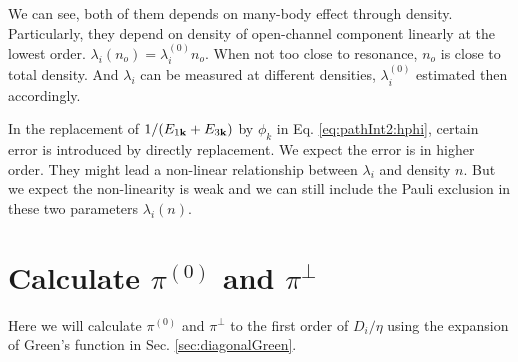We can see, both of them depends on many-body effect through density.  Particularly, they depend on density of open-channel component linearly at the lowest order.  $\lambda_{i}(n_o)=\lambda_{i}^{(0)}n_o$.  When not too close to resonance, $n_o$ is close to total density.  And $\lambda_{i}$ can be measured at different densities,  $\lambda_{i}^{(0)}$ estimated then accordingly. 

In the replacement of $1/(E_{1\mathbf{k}}+E_{3\mathbf{k}})$ by $\phi_{k}$ in Eq. \ref{eq:pathInt2:hphi}, certain error is introduced by directly replacement.  We expect the error is in higher order.  They might lead a non-linear relationship between $\lambda_{i}$ and density $n$.  But we expect the non-linearity is weak and we can still include the Pauli exclusion in these two parameters $\lambda_{i}(n)$.




\section{Calculate $\pi^{(0)}$ and $\pi^{\perp}$\label{sec:calculatePi}}
Here we will calculate $\pi^{(0)}$ and $\pi^{\perp}$ to the first order of $D_i/\eta$ using the expansion of Green's function in Sec. \ref{sec:diagonalGreen}.

